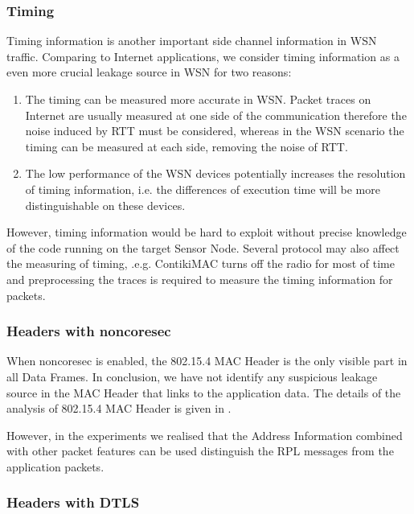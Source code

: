 \subsubsection{Timing}

Timing information is another important side channel information in WSN traffic. Comparing to Internet applications, we consider timing information as a even more crucial leakage source in WSN for two reasons:

\begin{enumerate}
	\item The timing can be measured more accurate in WSN. Packet traces on Internet are usually measured at one side of the communication therefore the noise induced by RTT must be considered, whereas in the WSN scenario the timing can be measured at each side, removing the noise of RTT.
	\item The low performance of the WSN devices potentially increases the resolution of timing information, i.e. the differences of execution time will be more distinguishable on these devices.
\end{enumerate}

However, timing information would be hard to exploit without precise knowledge of the code running on the target Sensor Node. Several protocol may also affect the measuring of timing, .e.g. ContikiMAC turns off the radio for most of time and preprocessing the traces is required to measure the timing information for packets.

\subsubsection{Headers with noncoresec}

When noncoresec is enabled, the 802.15.4 MAC Header is the only visible part in all Data Frames. In conclusion, we have not identify any suspicious leakage source in the MAC Header that links to the application data. The details of the analysis of 802.15.4 MAC Header is given in . 

However, in the experiments we realised that the Address Information combined with other packet features can be used distinguish the RPL messages from the application packets.

\subsubsection{Headers with DTLS}

